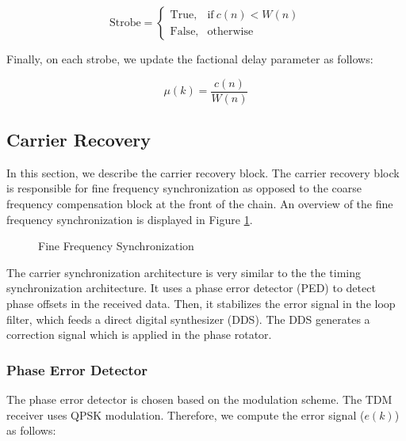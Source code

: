 \documentclass[conference,onecolumn]{IEEEtran}
\begin{document}
\begin{equation}
	\text{Strobe} = \begin{cases}
		\text{True}, & \text{if}\ c(n) < W(n)\\
		\text{False}, & \text{otherwise}
	\end{cases}
\end{equation}

\noindent Finally, on each strobe, we update the factional delay parameter as follows:

\begin{equation}
	\mu(k) = \frac{c(n)}{W(n)}
\end{equation}

\subsection{Carrier Recovery}

In this section, we describe the carrier recovery block. The carrier recovery block is responsible for fine frequency synchronization as opposed to the coarse frequency compensation block at the front of the chain. An overview of the fine frequency synchronization is displayed in Figure \ref{fig::carrier_synchronization}.

\begin{figure}[H]
	\centerline{}
	\caption{Fine Frequency Synchronization}
	\label{fig::carrier_synchronization}
\end{figure}

The carrier synchronization architecture is very similar to the the timing synchronization architecture. It uses a phase error detector (PED) to detect phase offsets in the received data. Then, it stabilizes the error signal in the loop filter, which feeds a direct digital synthesizer (DDS). The DDS generates a correction signal which is applied in the phase rotator.

\subsubsection{Phase Error Detector}

The phase error detector is chosen based on the modulation scheme. The TDM receiver uses QPSK modulation. Therefore, we compute the error signal ($e(k)$) as follows:
\end{document}
